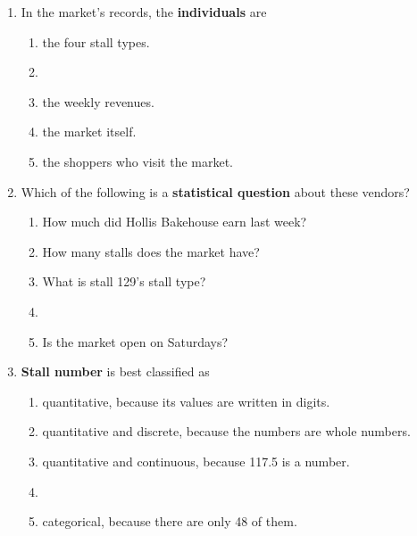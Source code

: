 \documentclass[12pt]{article}
\newcommand{\letterroom}{\rule[-15pt]{0pt}{36pt}}
\begin{document}
\vspace{0.10in}

\begin{enumerate}[leftmargin=1.9em, itemsep=0.13in]

  \boxguard[9]
  \item In the market's records, the \textbf{individuals} are
        \begin{enumerate}[label=\textbf{(\Alph*)}, leftmargin=2.2em, itemsep=2pt]
          \item the four stall types.
          \item {}
          \item the weekly revenues.
          \item the market itself.
          \item the shoppers who visit the market.
                \hfill{}\letterroom
        \end{enumerate}

  \boxguard[9]
  \item Which of the following is a \textbf{statistical question} about these vendors?
        \begin{enumerate}[label=\textbf{(\Alph*)}, leftmargin=2.2em, itemsep=2pt]
          \item How much did Hollis Bakehouse earn last week?
          \item How many stalls does the market have?
          \item What is stall 129's stall type?
          \item {}
          \item Is the market open on Saturdays?
                \hfill{}\letterroom
        \end{enumerate}

  \boxguard[9]
  \item \textbf{Stall number} is best classified as
        \begin{enumerate}[label=\textbf{(\Alph*)}, leftmargin=2.2em, itemsep=2pt]
          \item quantitative, because its values are written in digits.
          \item quantitative and discrete, because the numbers are whole numbers.
          \item quantitative and continuous, because 117.5 is a number.
          \item {}
          \item categorical, because there are only 48 of them.
                \hfill{}\letterroom
        \end{enumerate}


\end{enumerate}
\end{document}
